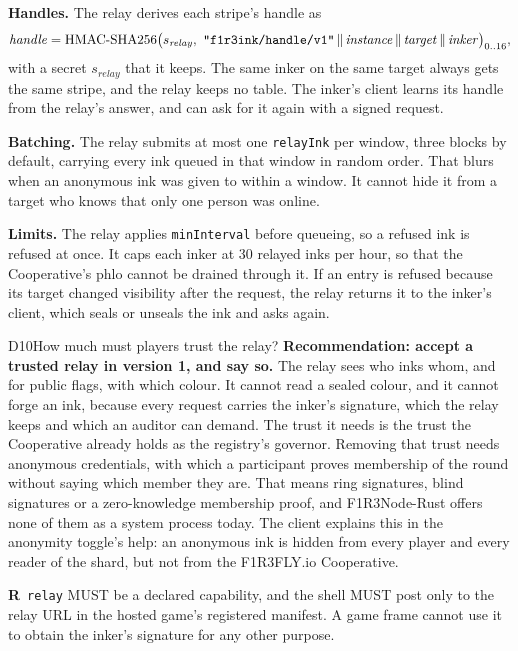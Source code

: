 \documentclass[11pt,a4paper]{article}
\newcommand{\code}[1]{\texttt{#1}}
\newcommand{\MUST}{{\fontsize{0.82em}{1em}\selectfont MUST}}
\newcounter{req}
\newcommand{\req}[1]{\refstepcounter{req}\label{#1}\textbf{R\thereq}}
\begin{document}
\textbf{Handles.} The relay derives each stripe's handle as
\[
  \mathit{handle} = \mathrm{HMAC\text{-}SHA256}\bigl(s_{\mathit{relay}},\ \text{\code{"f1r3ink/handle/v1"}} \,\|\, \mathit{instance} \,\|\, \mathit{target} \,\|\, \mathit{inker}\bigr)_{0..16},
\]
with a secret $s_{\mathit{relay}}$ that it keeps. The same inker on the same target always gets
the same stripe, and the relay keeps no table. The inker's client learns its handle from the
relay's answer, and can ask for it again with a signed request.

\textbf{Batching.} The relay submits at most one \code{relayInk} per window, three blocks by
default, carrying every ink queued in that window in random order. That blurs when an anonymous
ink was given to within a window. It cannot hide it from a target who knows that only one person
was online.

\textbf{Limits.} The relay applies \code{minInterval} before queueing, so a refused ink is
refused at once. It caps each inker at 30 relayed inks per hour, so that the Cooperative's phlo
cannot be drained through it. If an entry is refused because its target changed visibility
after the request, the relay returns it to the inker's client, which seals or unseals the ink
and asks again.

\begin{decision}{D10}{How much must players trust the relay?}
\textbf{Recommendation: accept a trusted relay in version 1, and say so.} The relay sees who
inks whom, and for public flags, with which colour. It cannot read a sealed colour, and it
cannot forge an ink, because every request carries the inker's signature, which the relay keeps
and which an auditor can demand. The trust it needs is the trust the Cooperative already holds
as the registry's governor. Removing that trust needs anonymous credentials, with which a
participant proves membership of the round without saying which member they are. That means ring
signatures, blind signatures or a zero-knowledge membership proof, and F1R3Node-Rust offers none
of them as a system process today. The client explains this in the anonymity toggle's help: an
anonymous ink is hidden from every player and every reader of the shard, but not from the
F1R3FLY.io Cooperative.
\end{decision}

\req{r:relay-cap}~\code{relay} \MUST{} be a declared capability, and the shell \MUST{} post only
to the relay URL in the hosted game's registered manifest. A game frame cannot use it to obtain
the inker's signature for any other purpose.
\end{document}
